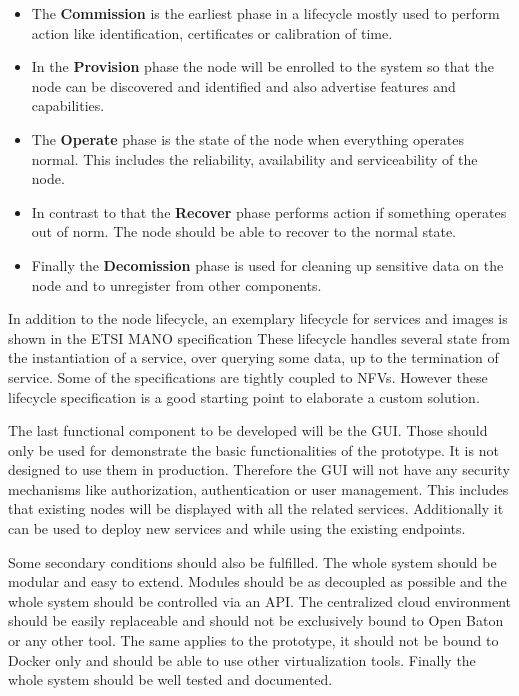 \begin{itemize}
  \item The \textbf{Commission} is the earliest phase in a lifecycle mostly used to perform action like identification, certificates or calibration of time.\autocite[p. 52 f.]{OpenFog:2017}
  \item In the \textbf{Provision} phase the node will be enrolled to the system so that the node can be discovered and identified and also advertise features and capabilities.\autocite[p. 52 f.]{OpenFog:2017}
  \item The \textbf{Operate} phase is the state of the node when everything operates normal. This includes the reliability, availability and serviceability of the node.\autocite[p. 53]{OpenFog:2017}
  \item In contrast to that the \textbf{Recover} phase performs action if something operates out of norm.\autocite[p. 53]{OpenFog:2017} The node should be able to recover to the normal state.\autocite[p. 53]{OpenFog:2017}
  \item Finally the \textbf{Decomission} phase is used for cleaning up sensitive data on the node and to unregister from other components.\autocite[p. 53]{OpenFog:2017}
\end{itemize}

In addition to the node lifecycle, an exemplary lifecycle for services and images is shown in the \ac{ETSI} \ac{MANO} specification\autocite[p. 67 ff.]{ETSI:MANO:2014}
These lifecycle handles several state from the instantiation of a service, over querying some data, up to the termination of service.
Some of the specifications are tightly coupled to \acp{NFV}.
However these lifecycle specification is a good starting point to elaborate a custom solution.

The last functional component to be developed will be the \ac{GUI}.
Those should only be used for demonstrate the basic functionalities of the prototype.
It is not designed to use them in production.
Therefore the \ac{GUI} will not have any security mechanisms like authorization, authentication or user management.
This includes that existing nodes will be displayed with all the related services.
Additionally it can be used to deploy new services and while using the existing endpoints.

Some secondary conditions should also be fulfilled.
The whole system should be modular and easy to extend.
Modules should be as decoupled as possible and the whole system should be controlled via an \ac{API}.
The centralized cloud environment should be easily replaceable and should not be exclusively bound to Open Baton or any other tool.
The same applies to the prototype, it should not be bound to Docker only and should be able to use other virtualization tools.
Finally the whole system should be well tested and documented.


